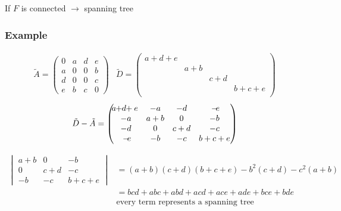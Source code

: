 If $F$ is connected $\rightarrow$ spanning tree

\subsubsection*{Example}

\begin{equation*}
\begin{array}{ll}
	\tilde A = \begin{pmatrix}
		0 & a & d & e \\
		a & 0 & 0 & b \\
		d & 0 & 0 & c \\
		e & b & c & 0 
	\end{pmatrix}
	&
	\tilde D = \begin{pmatrix}
		a+d+e \\
		& a+b \\
		& & c+d \\
		& & & b+c+e \\
	\end{pmatrix}
\end{array} 
\end{equation*}
\begin{equation*}
	\tilde D - \tilde A = \begin{pmatrix}
		\tikzmark{topA}a+\tikzmark{topA2}d+e & -a & -d & -\tikzmark{topB}e \\
		 -a & a+b & 0 & -b \\
		-d & 0 & c+d & -c \\
		-\tikzmark{botA}e & -b & -c & b+c+e \\
	\end{pmatrix}
\end{equation*}

\begin{equation*}
\begin{array}{ll}
\begin{vmatrix}
	a+b & 0 & -b \\
	0 & c+d & -c \\
	-b & -c & b+c+e
\end{vmatrix} 
& = (a+b)(c+d)(b+c+e)-b^2(c+d)-c^2(a+b) \\
& = bcd + abc+ abd +acd + ace + ade + bce + bde \\
& \text{every term represents a spanning tree}
\end{array}
\end{equation*}

